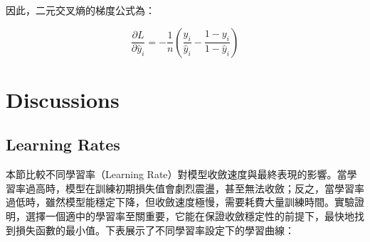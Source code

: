 \documentclass{article}
\begin{document}
因此，二元交叉熵的梯度公式為：

\[
\boxed{
\frac{\partial L}{\partial \hat{y}_i}
= - \frac{1}{n} \left( \frac{y_i}{\hat{y}_i} - \frac{1 - y_i}{1 - \hat{y}_i} \right)
}
\]

\section{Discussions}

\subsection{Learning Rates}
本節比較不同學習率（Learning Rate）對模型收斂速度與最終表現的影響。當學習率過高時，模型在訓練初期損失值會劇烈震盪，甚至無法收斂；反之，當學習率過低時，雖然模型能穩定下降，但收斂速度極慢，需要耗費大量訓練時間。實驗證明，選擇一個適中的學習率至關重要，它能在保證收斂穩定性的前提下，最快地找到損失函數的最小值。下表展示了不同學習率設定下的學習曲線：
\end{document}
